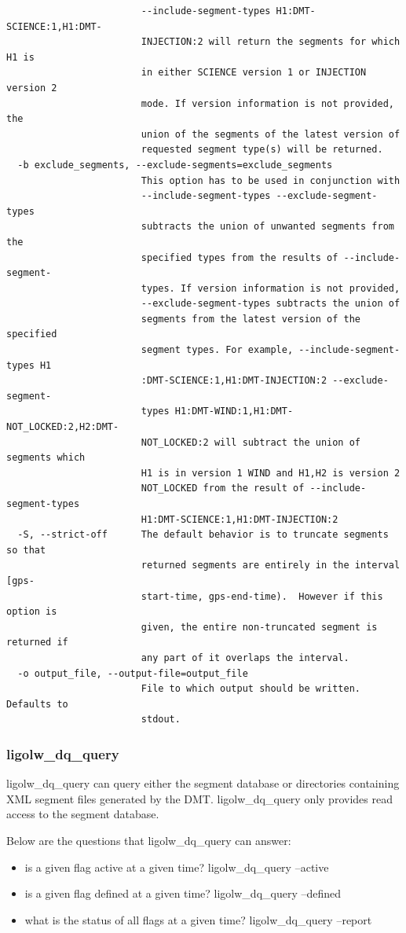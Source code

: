 {\begin{verbatim}
                        --include-segment-types H1:DMT-SCIENCE:1,H1:DMT-
                        INJECTION:2 will return the segments for which H1 is
                        in either SCIENCE version 1 or INJECTION version 2
                        mode. If version information is not provided, the
                        union of the segments of the latest version of
                        requested segment type(s) will be returned.
  -b exclude_segments, --exclude-segments=exclude_segments
                        This option has to be used in conjunction with
                        --include-segment-types --exclude-segment-types
                        subtracts the union of unwanted segments from the
                        specified types from the results of --include-segment-
                        types. If version information is not provided,
                        --exclude-segment-types subtracts the union of
                        segments from the latest version of the specified
                        segment types. For example, --include-segment-types H1
                        :DMT-SCIENCE:1,H1:DMT-INJECTION:2 --exclude-segment-
                        types H1:DMT-WIND:1,H1:DMT-NOT_LOCKED:2,H2:DMT-
                        NOT_LOCKED:2 will subtract the union of segments which
                        H1 is in version 1 WIND and H1,H2 is version 2
                        NOT_LOCKED from the result of --include-segment-types
                        H1:DMT-SCIENCE:1,H1:DMT-INJECTION:2
  -S, --strict-off      The default behavior is to truncate segments so that
                        returned segments are entirely in the interval [gps-
                        start-time, gps-end-time).  However if this option is
                        given, the entire non-truncated segment is returned if
                        any part of it overlaps the interval.
  -o output_file, --output-file=output_file
                        File to which output should be written.  Defaults to
                        stdout.
\end{verbatim}
}

\subsubsection{ligolw\_dq\_query}
ligolw\_dq\_query can query either the segment database or directories containing XML segment files generated by the DMT. ligolw\_dq\_query only provides read access to the segment database. 

Below are the questions that ligolw\_dq\_query can answer:
\begin{itemize}
\item is a given flag active at a given time? ligolw\_dq\_query --active
\item is a given flag defined at a given time? ligolw\_dq\_query --defined
\item what is the status of all flags at a given time? ligolw\_dq\_query --report
\end{itemize}


